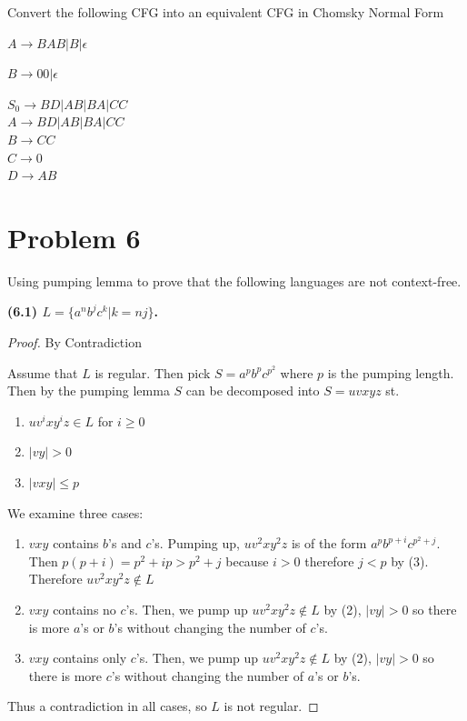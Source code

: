 \documentclass[11pt]{article}
\begin{document}
\noindent
Convert the following CFG into an equivalent CFG in Chomsky Normal Form

$A\rightarrow BAB|B|\epsilon$

$B\rightarrow 00|\epsilon$


$S_0 \rightarrow BD | AB | BA | CC$\\
$A \rightarrow BD | AB | BA | CC$\\
$B \rightarrow CC$\\
$C \rightarrow 0$\\
$D \rightarrow AB$

\newpage
\section*{Problem 6}

\noindent
Using pumping lemma to prove that the following languages are not
context-free.

\textbf{(6.1) $L=\{a^nb^jc^k|k=nj\}$.}
\newline

\begin{proof} By Contradiction

Assume that $L$ is regular. Then pick $S = a^p b^p c^{p^2}$ where $p$ is the pumping length. Then by the pumping lemma $S$ can be decomposed into $S = uvxyz$ st.

\begin{enumerate}[(1)]

 \item $uv^ixy^iz \in L$ for $i \geq 0$
 \item $|vy| > 0$
 \item $|vxy| \leq p$

\end{enumerate}

We examine three cases:
\begin{enumerate}
	\item $vxy$ contains $b$'s and $c$'s. Pumping up, $uv^2xy^2z$ is of the form $a^p b^{p + i} c^{p^2 + j}$. Then $p(p+i) = p^2 + ip > p^2 + j$ because $i > 0$ therefore $j < p$ by (3). Therefore $uv^2 x y^2 z \notin L$
	\item $vxy$ contains no $c$'s. Then, we pump up $uv^2 x y^2 z \notin L$ by (2), $|vy| > 0$ so there is more $a$'s or $b$'s without changing the number of $c$'s. 
	\item $vxy$ contains only $c$'s. Then, we pump up $uv^2 x y^2 z \notin L$ by (2), $|vy| > 0$ so there is more $c$'s without changing the number of $a$'s or $b$'s.

\end{enumerate}

Thus a contradiction in all cases, so $L$ is not regular.

\end{proof}
\end{document}
